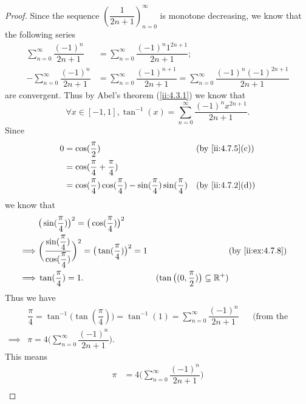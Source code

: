 \begin{proof}
  Since the sequence \((\dfrac{1}{2n + 1})_{n = 0}^\infty\) is monotone decreasing, we know that the following series
  \begin{align*}
    \sum_{n = 0}^\infty \dfrac{(-1)^n}{2n + 1}  & = \sum_{n = 0}^\infty \dfrac{(-1)^n 1^{2n + 1}}{2n + 1};                                                      \\
    -\sum_{n = 0}^\infty \dfrac{(-1)^n}{2n + 1} & = \sum_{n = 0}^\infty \dfrac{(-1)^{n + 1}}{2n + 1} = \sum_{n = 0}^\infty \dfrac{(-1)^n (-1)^{2n + 1}}{2n + 1}
  \end{align*}
  are convergent.
  Thus by Abel's theorem (\cref{ii:4.3.1}) we know that
  \[
    \forall x \in [-1, 1], \tan^{-1}(x) = \sum_{n = 0}^\infty \dfrac{(-1)^n x^{2n + 1}}{2n + 1}.
  \]
  Since
  \begin{align*}
    0 & = \cos(\dfrac{\pi}{2})                                                                  &  & \by{ii:4.7.5}[c] \\
      & = \cos(\dfrac{\pi}{4} + \dfrac{\pi}{4})                                                                       \\
      & = \cos(\dfrac{\pi}{4}) \cos(\dfrac{\pi}{4}) - \sin(\dfrac{\pi}{4}) \sin(\dfrac{\pi}{4}) &  & \by{ii:4.7.2}[d]
  \end{align*}
  we know that
  \begin{align*}
             & \big(\sin(\dfrac{\pi}{4})\big)^2 = \big(\cos(\dfrac{\pi}{4})\big)^2                                                                                                             \\
    \implies & \bigg(\dfrac{\sin(\dfrac{\pi}{4})}{\cos(\dfrac{\pi}{4})}\bigg)^2 = \big(\tan(\dfrac{\pi}{4})\big)^2 = 1 &                                                    & \by{ii:ex:4.7.8} \\
    \implies & \tan(\dfrac{\pi}{4}) = 1.                                                                               & (\tan\big((0, \dfrac{\pi}{2})\big) \subseteq \R^+)
  \end{align*}
  Thus we have
  \begin{align*}
             & \dfrac{\pi}{4} = \tan^{-1}\big(\tan(\dfrac{\pi}{4})\big) = \tan^{-1}(1) = \sum_{n = 0}^\infty \dfrac{(-1)^n}{2n + 1} &  & \text{(from the proof above)} \\
    \implies & \pi = 4 \bigg(\sum_{n = 0}^\infty \dfrac{(-1)^n}{2n + 1}\bigg).
  \end{align*}
  This means
  \begin{align*}
    \pi & = 4 \bigg(\sum_{n = 0}^\infty \dfrac{(-1)^n}{2n + 1}\bigg)                                                                                 \\

\end{align*}
\end{proof}
